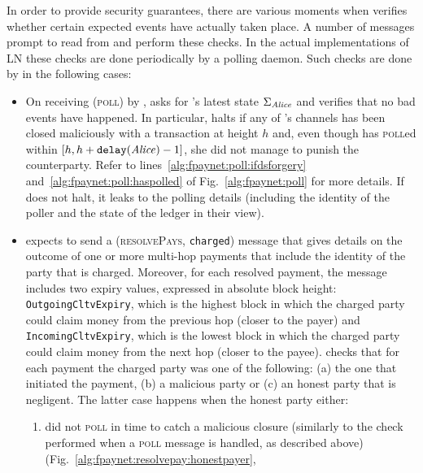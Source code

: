   In order to provide security guarantees, there are various moments when
  \fpaynet{} verifies whether certain expected events have actually taken place.
  A number of messages prompt \fpaynet{} to read from \ledger{} and perform
  these checks. In the actual implementations of LN these checks are done
  periodically by a polling daemon. Such checks are done by \fpaynet{} in the
  following cases:
  \begin{itemize}
    \item On receiving (\textsc{poll}) by \alice, \fpaynet{} asks \ledger{} for
    \alice's latest state $\Sigma_{\mathit{Alice}}$ and verifies that no bad events have
    happened. In particular, \fpaynet{} halts if any of \alice's channels has
    been closed maliciously with a transaction at height $h$ and, even though
    \alice{} has \textsc{poll}ed within $[h, h + \mathtt{delay}(\mathit{Alice}) - 1]$,
    she did not manage to punish the counterparty. Refer to
    lines~\ref{alg:fpaynet:poll:ifdsforgery}
    and~\ref{alg:fpaynet:poll:haspolled} of Fig.~\ref{alg:fpaynet:poll} for more
    details. If \fpaynet{} does not halt, it leaks to \simulator{} the polling
    details (including the identity of the poller and the state of the ledger in
    their view).
    \item \fpaynet{} expects \simulator{} to send a (\textsc{resolvePays},
    \texttt{charged}) message that gives details on the outcome of one or more
    multi-hop payments that include the identity of the party that is charged.
    Moreover, for each resolved payment, the message includes two expiry values,
    expressed in absolute block height: \texttt{OutgoingCltvExpiry}, which is
    the highest block in which the charged party could claim money from the
    previous hop (closer to the payer) and \texttt{IncomingCltvExpiry}, which is
    the lowest block in which the charged party could claim money from the next
    hop (closer to the payee). \fpaynet{} checks that for each payment the
    charged party was one of the following: (a) the one that initiated the
    payment, (b) a malicious party or (c) an honest party that is negligent. The
    latter case happens when the honest party either:
    \begin{enumerate}
      \item did not \textsc{poll} in time to catch a malicious closure
      (similarly to the check performed when a \textsc{poll} message is handled,
      as described above) (Fig.~\ref{alg:fpaynet:resolvepay:honestpayer},

\end{enumerate}
\end{itemize}

